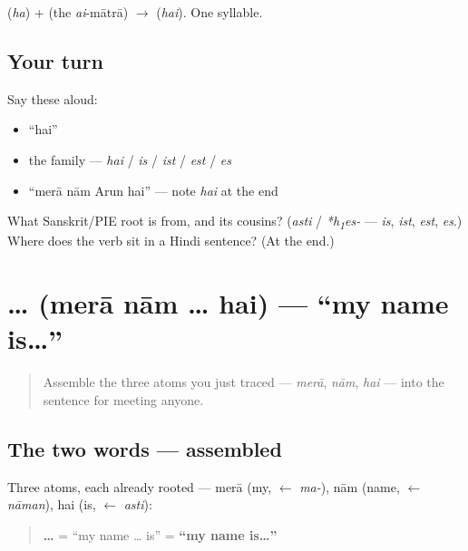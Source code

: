 \begin{sounds}
 (\emph{ha}) +  (the \emph{ai}-mātrā) $\to$  (\emph{hai}). One syllable.
\end{sounds}

\subsection*{Your turn}
Say these aloud:

\begin{itemize}
\raggedright
  \item \textquotedblleft{}hai\textquotedblright{}
  \item the family — \emph{hai} / \emph{is} / \emph{ist} / \emph{est} / \emph{es}
  \item \textquotedblleft{}merā nām Arun hai\textquotedblright{} — note \emph{hai} at the end
\end{itemize}

\begin{tcolorbox}[breakable,colback=teal!4,colframe=teal!35!black,title={Before you move on}]
What Sanskrit/PIE root is \textbf{} from, and its cousins? (\emph{asti} / \emph{*h\textsubscript{1}es-} — \emph{is}, \emph{ist}, \emph{est}, \emph{es}.) Where does the verb sit in a Hindi sentence? (At the end.)
\end{tcolorbox}
\section[\texorpdfstring{\hi{मेरा} \hi{नाम} … \hi{है} (merā nām … hai)}{मेरा नाम … है (merā nām … hai)}]{  …  (merā nām … hai) — \textquotedblleft{}my name is…\textquotedblright{}}

\label{lesson:HI-C02-mera-naam-hai}



\begin{quote}
Assemble the three atoms you just traced — \emph{merā}, \emph{nām}, \emph{hai} — into the sentence for meeting anyone.
\end{quote}

\subsection*{The two words — assembled}
Three atoms, each already rooted — merā (my, $\leftarrow$ \emph{ma-}), nām (name, $\leftarrow$ \emph{nāman}), hai (is, $\leftarrow$ \emph{asti}):

\begin{quote}
\textbf{  … } = \textquotedblleft{}my name … is\textquotedblright{} = \textbf{\textquotedblleft{}my name is…\textquotedblright{}}
\end{quote}

